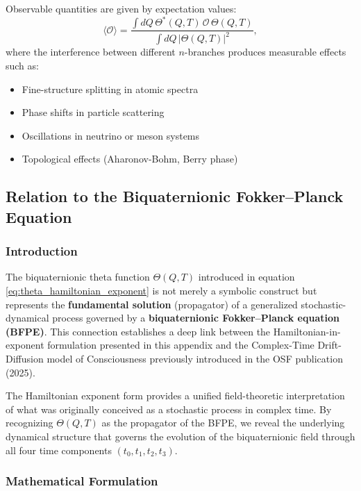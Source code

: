 Observable quantities are given by expectation values:
\begin{equation}
\langle \mathcal{O} \rangle = \frac{\int dQ \, \Theta^*(Q,T) \, \mathcal{O} \, \Theta(Q,T)}{\int dQ \, |\Theta(Q,T)|^2},
\label{eq:observables}
\end{equation}
where the interference between different $n$-branches produces measurable effects such as:
\begin{itemize}
\item Fine-structure splitting in atomic spectra
\item Phase shifts in particle scattering
\item Oscillations in neutrino or meson systems
\item Topological effects (Aharonov-Bohm, Berry phase)
\end{itemize}

\subsection{Relation to the Biquaternionic Fokker--Planck Equation}
\label{subsec:biquaternionic_fokker_planck}

\subsubsection{Introduction}

The biquaternionic theta function $\Theta(Q,T)$ introduced in equation \eqref{eq:theta_hamiltonian_exponent} is not merely a symbolic construct but represents the \textbf{fundamental solution} (propagator) of a generalized stochastic-dynamical process governed by a \textbf{biquaternionic Fokker--Planck equation (BFPE)}. This connection establishes a deep link between the Hamiltonian-in-exponent formulation presented in this appendix and the Complex-Time Drift-Diffusion model of Consciousness previously introduced in the OSF publication (2025).

The Hamiltonian exponent form provides a unified field-theoretic interpretation of what was originally conceived as a stochastic process in complex time. By recognizing $\Theta(Q,T)$ as the propagator of the BFPE, we reveal the underlying dynamical structure that governs the evolution of the biquaternionic field through all four time components $(t_0, t_1, t_2, t_3)$.

\subsubsection{Mathematical Formulation}

